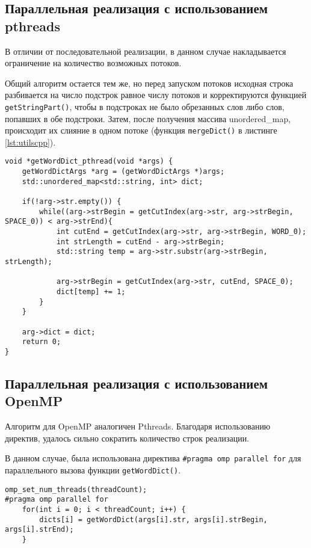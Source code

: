 \subsection{Параллельная реализация с использованием pthreads}

В отличии от последовательной реализации, в данном случае накладывается ограничение на количество возможных потоков.

Общий алгоритм остается тем же, но перед запуском потоков исходная строка разбивается на число подстрок равное числу потоков и корректируются функцией \texttt{getStringPart()}, чтобы в подстроках не было обрезанных слов либо слов, попавших в обе подстроки. Затем, после получения массива unordered\_map, происходит их слияние в одном потоке (функция \texttt{mergeDict()} в листинге \vref{lst:utilscpp}).

\begin{lstlisting}[label=lst:VHDL,caption=отрывок utils.cpp]
void *getWordDict_pthread(void *args) {
	getWordDictArgs *arg = (getWordDictArgs *)args; 
	std::unordered_map<std::string, int> dict;

	if(!arg->str.empty()) {
		while((arg->strBegin = getCutIndex(arg->str, arg->strBegin, SPACE_0)) < arg->strEnd){
			int cutEnd = getCutIndex(arg->str, arg->strBegin, WORD_0);
			int strLength = cutEnd - arg->strBegin;
			std::string temp = arg->str.substr(arg->strBegin, strLength);

			arg->strBegin = getCutIndex(arg->str, cutEnd, SPACE_0);
			dict[temp] += 1;
		}
	}

	arg->dict = dict;
	return 0;
}
\end{lstlisting}

\subsection{Параллельная реализация с использованием OpenMP}

Алгоритм для OpenMP аналогичен Pthreads. Благодаря использованию директив, удалось сильно сократить количество строк реализации.

В данном случае, была использована директива \texttt{\#pragma omp parallel for} для параллельного вызова функции \texttt{getWordDict()}.

\begin{lstlisting}[label=lst:VHDL,caption=отрывок main.cpp]
omp_set_num_threads(threadCount);
#pragma omp parallel for
	for(int i = 0; i < threadCount; i++) {
		dicts[i] = getWordDict(args[i].str, args[i].strBegin, args[i].strEnd);
	}
\end{lstlisting}


